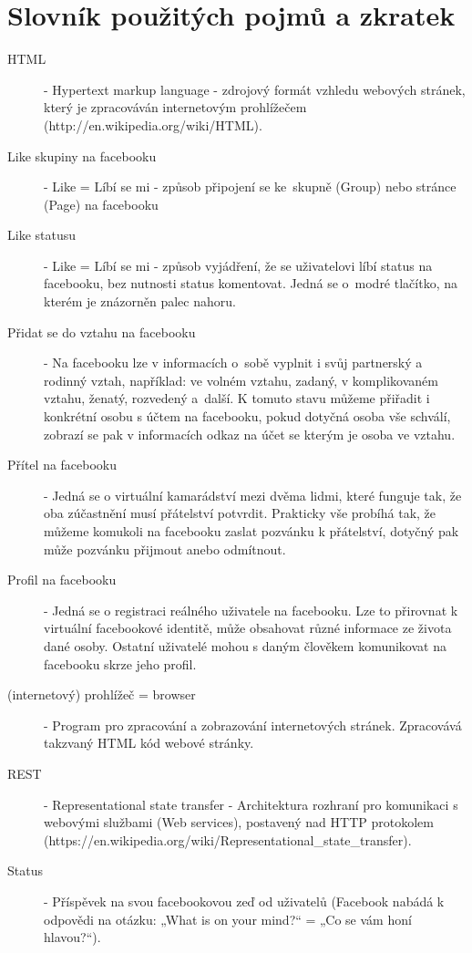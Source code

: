 \documentclass[thesis=M,czech]{FITthesis}[2013/05/10]
\begin{document}
\chapter{Slovník použitých pojmů a zkratek}
\begin{description}
	\item[HTML] - Hypertext markup language - zdrojový formát vzhledu webových stránek, který je zpracováván internetovým prohlížečem
		\newline(http://en.wikipedia.org/wiki/HTML).
	\item[Like skupiny na facebooku] - Like = Líbí se mi - způsob připojení se ke~skupně (Group) nebo stránce (Page) na facebooku
	\item[Like statusu] - Like = Líbí se mi - způsob vyjádření, že se uživatelovi líbí status na facebooku, bez nutnosti status komentovat. Jedná se o~modré tlačítko, na kterém je znázorněn palec nahoru.
	\item[Přidat se do vztahu na facebooku] - Na facebooku lze v informacích o~sobě vyplnit i svůj partnerský a rodinný vztah, například: ve volném vztahu, zadaný, v komplikovaném vztahu, ženatý, rozvedený a~další. K tomuto stavu můžeme přiřadit i konkrétní osobu s účtem na facebooku, pokud dotyčná osoba vše schválí, zobrazí se pak v informacích odkaz na účet se kterým je osoba ve vztahu.
	\item[Přítel na facebooku] - Jedná se o virtuální kamarádství mezi dvěma lidmi, které funguje tak, že oba zúčastnění musí přátelství potvrdit. Prakticky vše probíhá tak, že můžeme komukoli na facebooku zaslat pozvánku k přátelství, dotyčný pak může pozvánku přijmout anebo odmítnout.  
	\item[Profil na facebooku] - Jedná se o registraci reálného uživatele na facebooku. Lze to přirovnat k virtuální facebookové identitě, může obsahovat různé informace ze života dané osoby. Ostatní uživatelé mohou s daným člověkem komunikovat na facebooku skrze jeho profil.
	\item[(internetový) prohlížeč = browser] - Program pro zpracování a zobrazování internetových stránek. Zpracovává takzvaný HTML kód webové stránky.
	\item[REST] - Representational state transfer - Architektura rozhraní pro komunikaci s webovými službami (Web services), postavený nad HTTP protokolem
\newline(https://en.wikipedia.org/wiki/Representational\_state\_transfer).
	\item[Status] - Příspěvek na svou facebookovou zeď od uživatelů (Facebook nabádá k odpovědi na otázku: „What is on your mind?“ = „Co se vám honí hlavou?“).

\end{description}
\end{document}
